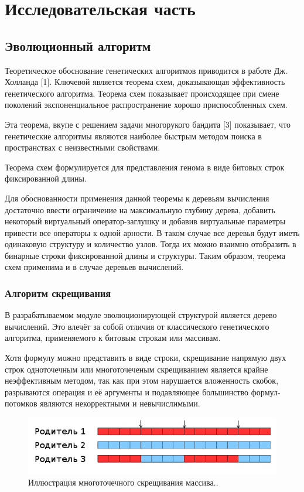 \section{Исследовательская часть}

\subsection{Эволюционный алгоритм}

Теоретическое обоснование генетических алгоритмов приводится в работе Дж. Холланда [1]. 
Ключевой является теорема схем, доказывающая эффективность генетического алгоритма. Теорема схем показывает происходящее при смене поколений экспоненциальное распространение хорошо приспособленных схем.

Эта теорема, вкупе с решением задачи многорукого бандита [3] показывает, что генетические алгоритмы являются наиболее быстрым методом поиска в пространствах с неизвестными свойствами.

Теорема схем формулируется для представления генома в виде битовых строк фиксированной длины.

Для обоснованности применения данной теоремы к деревьям вычисления достаточно ввести ограничение на максимальную глубину дерева, добавить некоторый виртуальный оператор-заглушку и добавив виртуальные параметры привести все операторы к одной арности. В таком случае все деревья будут иметь одинаковую структуру и количество узлов. Тогда их можно взаимно отобразить в бинарные строки фиксированной длины и структуры. Таким образом, теорема схем применима и в случае деревьев вычислений.

\clearpage
\subsubsection{Алгоритм скрещивания} \label{sssec:crossover}
В разрабатываемом модуле эволюционирующей структурой является дерево вычислений. Это влечёт за собой отличия от классического генетического алгоритма, применяемого к битовым строкам или массивам.

Хотя формулу можно представить в виде строки, скрещивание напрямую двух строк одноточечным или многоточеченым скрещиванием является крайне неэффективным методом, так как при этом нарушается вложенность скобок, разрываются операция и её аргументы и подавляющее большинство формул-потомков являются некорректными и невычислимыми.

\begin{figure}[!h]
\centering
\includegraphics[scale=0.7]{research/pics/1.png}
\caption{Иллюстрация многоточечного скрещивания массива..}
\label{figure:arrayCrossover}
\end{figure}



